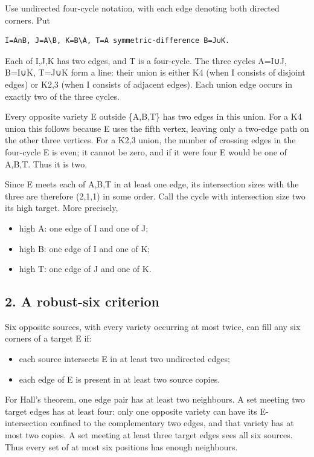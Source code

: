 \documentclass[
  10pt,
]{article}
\providecommand{\tightlist}{%
  \setlength{\itemsep}{0pt}\setlength{\parskip}{0pt}}
\begin{document}
Use undirected four-cycle notation, with each edge denoting both
directed corners. Put

\begin{verbatim}
I=A∩B, J=A\B, K=B\A, T=A symmetric-difference B=J∪K.
\end{verbatim}

Each of I,J,K has two edges, and T is a four-cycle. The three cycles
A=I∪J, B=I∪K, T=J∪K form a line: their union is either K4 (when I
consists of disjoint edges) or K2,3 (when I consists of adjacent edges).
Each union edge occurs in exactly two of the three cycles.

Every opposite variety E outside \{A,B,T\} has two edges in this union.
For a K4 union this follows because E uses the fifth vertex, leaving
only a two-edge path on the other three vertices. For a K2,3 union, the
number of crossing edges in the four-cycle E is even; it cannot be zero,
and if it were four E would be one of A,B,T. Thus it is two.

Since E meets each of A,B,T in at least one edge, its intersection sizes
with the three are therefore (2,1,1) in some order. Call the cycle with
intersection size two its high target. More precisely,

\begin{itemize}
\tightlist
\item
  high A: one edge of I and one of J;
\item
  high B: one edge of I and one of K;
\item
  high T: one edge of J and one of K.
\end{itemize}

\hypertarget{a-robust-six-criterion}{%
\subsection*{2. A robust-six criterion}\label{a-robust-six-criterion}}

Six opposite sources, with every variety occurring at most twice, can
fill any six corners of a target E if:

\begin{itemize}
\tightlist
\item
  each source intersects E in at least two undirected edges;
\item
  each edge of E is present in at least two source copies.
\end{itemize}

For Hall's theorem, one edge pair has at least two neighbours. A set
meeting two target edges has at least four: only one opposite variety
can have its E-intersection confined to the complementary two edges, and
that variety has at most two copies. A set meeting at least three target
edges sees all six sources. Thus every set of at most six positions has
enough neighbours.
\end{document}

